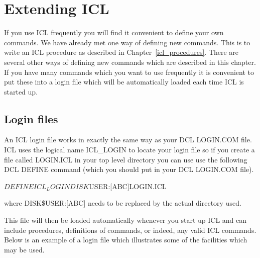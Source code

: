\documentclass[twoside,11pt,nolof,chapters]{starlink}
\begin{document}
\chapter{Extending ICL}

If you use ICL frequently you will find it convenient to define your own
commands. We have already met one way of defining new commands. This is
to write an ICL procedure as described in Chapter~\ref{icl_procedures}. There are several other
ways of defining new commands which are described in this chapter. If you
have many commands which you want to use frequently it is convenient to
put these into a login file which will be automatically loaded each time
ICL is started up.

\section{Login files}

An ICL login file works in exactly the same way as your DCL LOGIN.COM file. ICL
uses the logical name ICL\_LOGIN to locate your login file so if you create a
file called LOGIN.ICL in your top level directory you can use use the following
DCL DEFINE command (which you should put in your DCL LOGIN.COM file).
\begin{terminalv}
   $ DEFINE ICL_LOGIN DISK$USER:[ABC]LOGIN.ICL
\end{terminalv}
where DISK\$USER:$[$ABC$]$ needs to be replaced by the actual directory used.

This file will then be loaded automatically whenever you start up ICL and
can include procedures, definitions of commands, or indeed, any valid ICL
commands. Below is an example of a login file which illustrates some of
the facilities which may be used.
\end{document}
